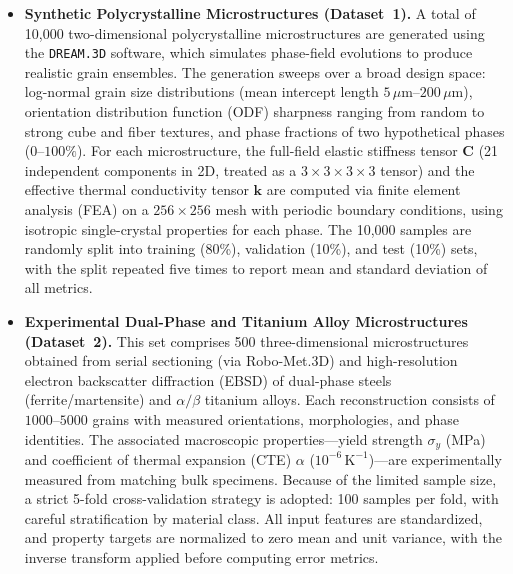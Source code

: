 \documentclass{article}
\begin{document}
\begin{itemize}
    \item \textbf{Synthetic Polycrystalline Microstructures (Dataset~1).} 
    A total of 10,000 two-dimensional polycrystalline microstructures are generated using the \texttt{DREAM.3D} software, which simulates phase-field evolutions to produce realistic grain ensembles. The generation sweeps over a broad design space: log-normal grain size distributions (mean intercept length $5\,\mu\text{m}$--$200\,\mu\text{m}$), orientation distribution function (ODF) sharpness ranging from random to strong cube and fiber textures, and phase fractions of two hypothetical phases ($0$–$100\%$). For each microstructure, the full-field elastic stiffness tensor $\mathbf{C}$ (21 independent components in 2D, treated as a $3\times3\times3\times3$ tensor) and the effective thermal conductivity tensor $\mathbf{k}$ are computed via finite element analysis (FEA) on a $256\times256$ mesh with periodic boundary conditions, using isotropic single-crystal properties for each phase. The 10,000 samples are randomly split into training (80\%), validation (10\%), and test (10\%) sets, with the split repeated five times to report mean and standard deviation of all metrics.

    \item \textbf{Experimental Dual-Phase and Titanium Alloy Microstructures (Dataset~2).}
    This set comprises 500 three-dimensional microstructures obtained from serial sectioning (via Robo-Met.3D) and high-resolution electron backscatter diffraction (EBSD) of dual-phase steels (ferrite/martensite) and $\alpha/\beta$ titanium alloys. Each reconstruction consists of $1000$–$5000$ grains with measured orientations, morphologies, and phase identities. The associated macroscopic properties—yield strength $\sigma_y$ (MPa) and coefficient of thermal expansion (CTE) $\alpha$ ($10^{-6}\,\text{K}^{-1}$)—are experimentally measured from matching bulk specimens. Because of the limited sample size, a strict 5-fold cross-validation strategy is adopted: 100 samples per fold, with careful stratification by material class. All input features are standardized, and property targets are normalized to zero mean and unit variance, with the inverse transform applied before computing error metrics.
\end{itemize}
\end{document}

